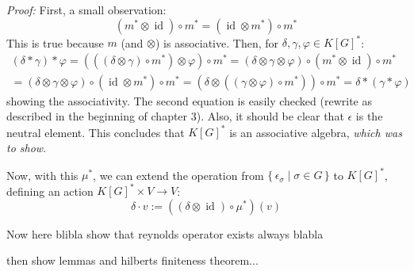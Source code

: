 \textit{Proof:} First, a small observation:
\begin{equation}
  \left(m^\ast \otimes \operatorname{id} \right) \circ m^\ast = \left( \operatorname{id} \otimes m^\ast \right) \circ m^\ast
\end{equation}
This is true because $m$ (and $ \otimes $) is associative.
Then, for $\delta, \gamma, \varphi \in K \left\lbrack G \right\rbrack^\ast$:
\begin{equation}
  \begin{aligned}
  \left( \delta \ast \gamma \right) \ast \varphi
  = \left( \left( \left( \delta \otimes \gamma \right) \circ m^\ast \right) \otimes \varphi \right) \circ m^\ast
  = \left( \delta \otimes \gamma \otimes \varphi \right) \circ \left( m^\ast \otimes \operatorname{id} \right) \circ m^\ast \\
  = \left( \delta \otimes \gamma \otimes \varphi \right) \circ \left( \operatorname{id} \otimes m^\ast \right) \circ m^\ast
  = \left( \delta \otimes \left( \left( \gamma \otimes \varphi \right) \circ m^\ast \right) \right) \circ m^\ast
  = \delta \ast \left( \gamma \ast \varphi \right)
  \end{aligned}
\end{equation}
showing the associativity.
The second equation is easily checked (rewrite as described in the beginning of chapter 3).
Also, it should be clear that $\epsilon$ is the neutral element.
This concludes that $K \left\lbrack G \right\rbrack^\ast$ is an associative algebra, \textit{which was to show}.

Now, with this $\mu^\ast$, we can extend the operation from $\{\, \epsilon_\sigma \mid \sigma \in G \, \} $ to $K \left\lbrack G \right\rbrack^\ast$, defining an action $K \left\lbrack G \right\rbrack^\ast \times V \longrightarrow V$:
\begin{equation}
  \delta \cdot v := \left(\left( \delta \otimes \operatorname{id} \right) \circ \mu^\ast \right) \left(v\right)
\end{equation}

Now here blibla show that reynolds operator exists always blabla

then show lemmas and hilberts finiteness theorem...


